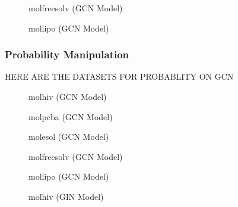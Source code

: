 \begin{figure}
    \centering
    \caption{molfreesolv (GCN Model)}
    \label{fig:gcn-molfreesolv}
\end{figure}

\begin{figure}
    \centering
    \caption{mollipo (GCN Model)}
    \label{fig:gcn-molfreesolv}
\end{figure}

\subsubsection{Probability Manipulation}

HERE ARE THE DATASETS FOR PROBABLITY ON GCN

\begin{figure}
    \centering
    \caption{molhiv (GCN Model)}
    \label{fig:gcn-molfreesolv}
\end{figure}

\begin{figure}
    \centering
    \caption{molpcba (GCN Model)}
    \label{fig:gcn-molfreesolv}
\end{figure}

\begin{figure}
    \centering
    \caption{molesol (GCN Model)}
    \label{fig:gcn-molfreesolv}
\end{figure}

\begin{figure}
    \centering
    \caption{molfreesolv (GCN Model)}
    \label{fig:gcn-molfreesolv}
\end{figure}

\begin{figure}
    \centering
    \caption{mollipo (GCN Model)}
    \label{fig:gcn-molfreesolv}
\end{figure}


\begin{figure}
    \centering
    \caption{molhiv (GIN Model)}
    \label{fig:gcn-molfreesolv}
\end{figure}

